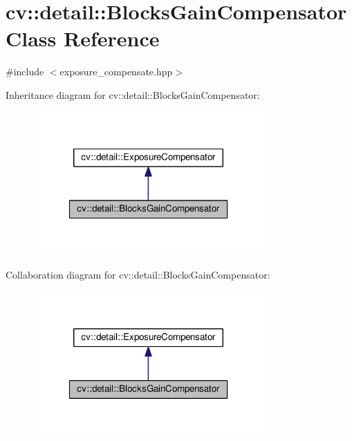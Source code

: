 \hypertarget{classcv_1_1detail_1_1BlocksGainCompensator}{\section{cv\-:\-:detail\-:\-:Blocks\-Gain\-Compensator Class Reference}
\label{classcv_1_1detail_1_1BlocksGainCompensator}
}


{\ttfamily \#include $<$exposure\-\_\-compensate.\-hpp$>$}



Inheritance diagram for cv\-:\-:detail\-:\-:Blocks\-Gain\-Compensator\-:\nopagebreak
\begin{figure}[H]
\begin{center}
\leavevmode
\includegraphics[width=250pt]{classcv_1_1detail_1_1BlocksGainCompensator__inherit__graph}
\end{center}
\end{figure}


Collaboration diagram for cv\-:\-:detail\-:\-:Blocks\-Gain\-Compensator\-:\nopagebreak
\begin{figure}[H]
\begin{center}
\leavevmode
\includegraphics[width=250pt]{classcv_1_1detail_1_1BlocksGainCompensator__coll__graph}
\end{center}
\end{figure}
